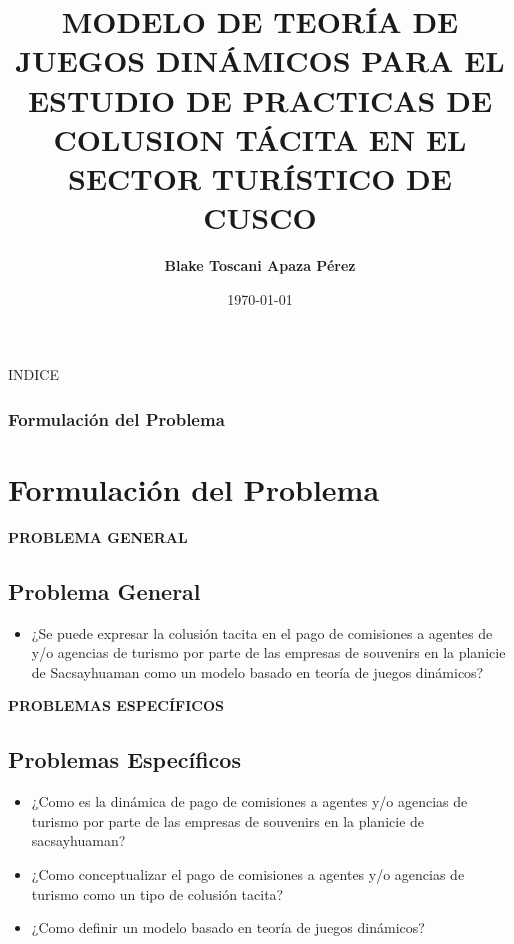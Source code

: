 \documentclass[11pt]{beamer}
\author{\textbf{Blake Toscani Apaza Pérez}}
\title[Game Theory]{\textbf{MODELO DE TEORÍA DE JUEGOS DINÁMICOS PARA EL ESTUDIO DE PRACTICAS DE COLUSION TÁCITA EN EL SECTOR TURÍSTICO DE CUSCO}}
\institute{{\large UNSAAC}\\ \vspace{0.5cm}ESCUELA DE POSGRADO\\ MAESTRÍA EN MATEMÁTICA}
\date{\today}
\begin{document}
	\begin{frame}[plain]
	\maketitle
	\end{frame}
	\begin{frame}{INDICE}
	\tableofcontents
	\end{frame}
	\begin{frame}
	\frametitle{Formulación del Problema}
	\section{Formulación del Problema}
		
		\textbf{PROBLEMA GENERAL}
		\subsection{Problema General}
		\begin{itemize}
			\item ¿Se puede expresar la colusión tacita en el pago de comisiones a agentes de  y/o agencias de turismo por parte de las empresas de souvenirs   en la planicie de Sacsayhuaman como un modelo basado en teoría de juegos dinámicos?	
		\end{itemize}
		\textbf{PROBLEMAS ESPECÍFICOS}
		\subsection{Problemas Específicos}
		\begin{itemize}
			\item ¿Como es la dinámica de pago de comisiones a agentes  y/o agencias de turismo por parte de las empresas de souvenirs   en la planicie de sacsayhuaman?
			\item ¿Como conceptualizar el pago de comisiones a agentes y/o agencias de turismo como un tipo de colusión tacita?
			\item ¿Como definir un modelo basado en teoría de juegos dinámicos?
		\end{itemize}
	\end{frame}
\end{document}
